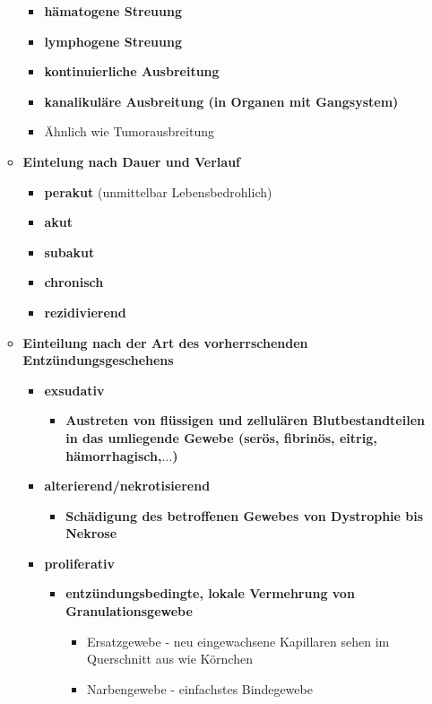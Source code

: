\begin{itemize}
\begin{itemize}
\begin{itemize}
				\item \textbf{hämatogene Streuung}
				\item \textbf{lymphogene Streuung}
				\item \textbf{kontinuierliche Ausbreitung}
				\item \textbf{kanalikuläre Ausbreitung (in Organen mit Gangsystem)}
				\item Ähnlich wie Tumorausbreitung
			\end{itemize}
		\item \textbf{Eintelung nach Dauer und Verlauf}
			\begin{itemize}
				\item \textbf{perakut} (unmittelbar Lebensbedrohlich)
				\item \textbf{akut}
				\item \textbf{subakut}
				\item \textbf{chronisch}
				\item \textbf{rezidivierend}
			\end{itemize}
		\item \textbf{Einteilung nach der Art des vorherrschenden Entzündungsgeschehens}
			\begin{itemize}
				\item \textbf{exsudativ}
					\begin{itemize}
						\item \textbf{Austreten von flüssigen und zellulären Blutbestandteilen in das umliegende Gewebe (serös, fibrinös, eitrig, hämorrhagisch,$\dots$)}
					\end{itemize}
				\item \textbf{alterierend/nekrotisierend}
					\begin{itemize}
						\item \textbf{Schädigung des betroffenen Gewebes von Dystrophie bis Nekrose}
					\end{itemize}
				\item \textbf{proliferativ}
					\begin{itemize}
						\item \textbf{entzündungsbedingte, lokale Vermehrung von Granulationsgewebe}
							\begin{itemize}
								\item Ersatzgewebe - neu eingewachsene Kapillaren sehen im Querschnitt aus wie Körnchen
								\item Narbengewebe - einfachstes Bindegewebe
							\end{itemize}
					\end{itemize}
			\end{itemize}
		\end{itemize}

\end{itemize}
